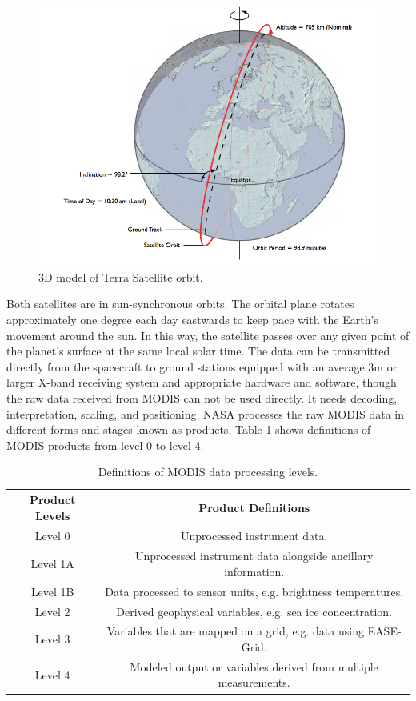\documentclass{article}
\begin{document}
\begin{figure}[!ht]
\begin{center}
\includegraphics[width=12cm]{inclination.png}
\caption{3D model of Terra Satellite orbit.\citep{king2007our}}
\label{Fig: 3DTerra}
\end{center}
\end{figure}

Both satellites are in sun-synchronous orbits. The orbital plane rotates approximately one degree each day eastwards to keep pace with the Earth's movement around the sun. In this way, the satellite passes over any given point of the planet's surface at the same local solar time. The data can be transmitted directly from the spacecraft to ground stations equipped with an average 3m or larger X-band receiving system and appropriate hardware and software, though the raw data received from MODIS can not be used directly.  It needs decoding, interpretation, scaling, and positioning. NASA processes the raw MODIS data in different forms and stages known as products. Table \ref{Tab:modisproduct} shows definitions of MODIS products from level 0 to level 4.

\begin{table}[!ht]
\caption{Definitions of MODIS data processing levels.}\label{Tab:modisproduct}
\centering
\begin{tabular}{|c|c|}
\hline
Product Levels & Product Definitions\\
\hline
Level 0 & Unprocessed instrument data.\\
\hline
Level 1A & Unprocessed instrument data alongside ancillary information.\\
\hline
Level 1B & Data processed to sensor units, e.g. brightness temperatures.\\
\hline
Level 2 & Derived geophysical variables, e.g. sea ice concentration.\\
\hline
Level 3 & Variables that are mapped on a grid, e.g. data using EASE-Grid.\\
\hline
Level 4 & Modeled output or variables derived from multiple measurements.\\
\hline
\end{tabular}
\end{table}
\end{document}

